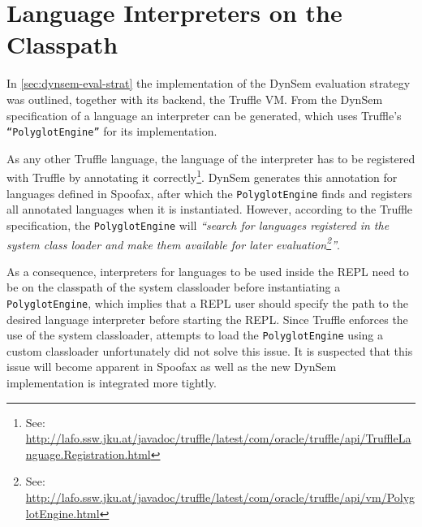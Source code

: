 \section{Language Interpreters on the Classpath}
\label{sec:classpath}

In \cref{sec:dynsem-eval-strat} the implementation of the DynSem evaluation
strategy was outlined, together with its backend, the Truffle VM.  From the
DynSem specification of a language an interpreter can be generated, which uses
Truffle's \texttt{``PolyglotEngine''} for its implementation.

As any other Truffle language, the language of the interpreter has to be
registered with Truffle by annotating it correctly\footnote{See:
\url{http://lafo.ssw.jku.at/javadoc/truffle/latest/com/oracle/truffle/api/TruffleLanguage.Registration.html}}.
DynSem generates this annotation for languages defined in Spoofax, after which
the \texttt{PolyglotEngine} finds and registers all annotated languages when it
is instantiated. However, according to the Truffle specification, the
\texttt{PolyglotEngine} will \textit{``search for languages registered in the system class
loader and make them available for later evaluation\footnote{See:
\url{http://lafo.ssw.jku.at/javadoc/truffle/latest/com/oracle/truffle/api/vm/PolyglotEngine.html}}''}.

As a consequence, interpreters for languages to be used inside the REPL need to
be on the classpath of the system classloader before instantiating a
\texttt{PolyglotEngine}, which implies that a REPL user should specify the path to
the desired language interpreter before starting the REPL. Since Truffle
enforces the use of the system classloader, attempts to load the
\texttt{PolyglotEngine} using a custom classloader unfortunately did not solve this
issue. It is suspected that this issue will become apparent in Spoofax as well as the new
DynSem implementation is integrated more tightly.

